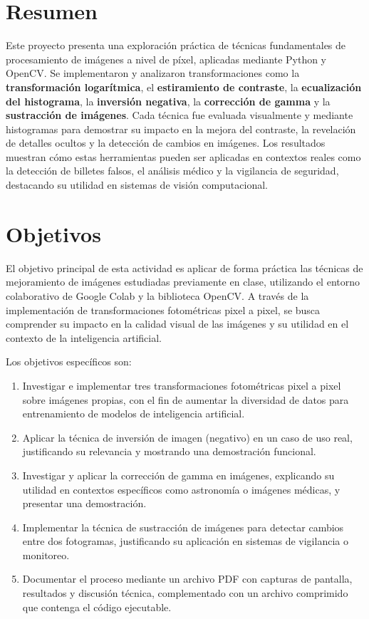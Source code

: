 \documentclass[12pt,letterpaper]{article}
\begin{document}
\setcounter{page}{1} %

\section*{Resumen}

Este proyecto presenta una exploración práctica de técnicas fundamentales de procesamiento de imágenes a nivel de píxel, aplicadas mediante Python y OpenCV. Se implementaron y analizaron transformaciones como la \textbf{transformación logarítmica}, el \textbf{estiramiento de contraste}, la \textbf{ecualización del histograma}, la \textbf{inversión negativa}, la \textbf{corrección de gamma} y la \textbf{sustracción de imágenes}. Cada técnica fue evaluada visualmente y mediante histogramas para demostrar su impacto en la mejora del contraste, la revelación de detalles ocultos y la detección de cambios en imágenes. Los resultados muestran cómo estas herramientas pueden ser aplicadas en contextos reales como la detección de billetes falsos, el análisis médico y la vigilancia de seguridad, destacando su utilidad en sistemas de visión computacional.
\section*{Objetivos}

El objetivo principal de esta actividad es aplicar de forma práctica las técnicas de mejoramiento de imágenes estudiadas previamente en clase, utilizando el entorno colaborativo de Google Colab y la biblioteca OpenCV. A través de la implementación de transformaciones fotométricas pixel a pixel, se busca comprender su impacto en la calidad visual de las imágenes y su utilidad en el contexto de la inteligencia artificial.

Los objetivos específicos son:

\begin{enumerate}
    \item Investigar e implementar tres transformaciones fotométricas pixel a pixel sobre imágenes propias, con el fin de aumentar la diversidad de datos para entrenamiento de modelos de inteligencia artificial.
    \item Aplicar la técnica de inversión de imagen (negativo) en un caso de uso real, justificando su relevancia y mostrando una demostración funcional.
    \item Investigar y aplicar la corrección de gamma en imágenes, explicando su utilidad en contextos específicos como astronomía o imágenes médicas, y presentar una demostración.
    \item Implementar la técnica de sustracción de imágenes para detectar cambios entre dos fotogramas, justificando su aplicación en sistemas de vigilancia o monitoreo.
    \item Documentar el proceso mediante un archivo PDF con capturas de pantalla, resultados y discusión técnica, complementado con un archivo comprimido que contenga el código ejecutable.
\end{enumerate}
\end{document}
